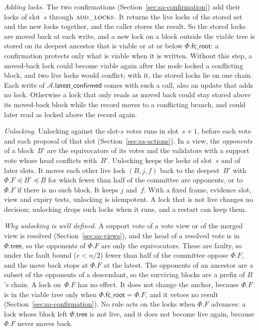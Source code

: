 \documentclass{article}
\newcommand{\AC}{\mathcal A}
\newcommand{\Fr}{\Phi}
\newcommand{\tree}{\mathsf{tree}}
\newcommand{\fcroot}{\mathsf{fc\_root}}
\newcommand{\latestConfirmed}{\mathsf{latest\_confirmed}}
\begin{document}
\emph{Adding locks.}  The two confirmations (Section~\ref{sec:sa-confirmation})
add their locks of slot~$s$ through $\Call{add\_locks}{}$.  It returns the
live locks of the stored set and the new locks together, and the caller
stores the result.  So the stored locks are moved back at each write, and
a new lock on a block outside the viable tree is stored on its deepest
ancestor that is viable or at or below $\Fr.\fcroot$: a confirmation
protects only what is viable when it is written.
Without this step, a moved-back lock could become viable again after the
node locked a conflicting block, and two live locks would conflict; with
it, the stored locks lie on one chain.  Each write of $\AC.\latestConfirmed$ comes with such a call,
also an update that adds no lock.  Otherwise a lock that only reads as
moved back could stay stored above its moved-back block while the record
moves to a conflicting branch, and could later read as locked above the
record again.

\emph{Unlocking.}  Unlocking against the slot-$s$ votes runs in
slot~$s+1$, before each vote and each proposal of that slot
(Section~\ref{sec:sa-actions}).  In a view, the \emph{opponents} of a
block~$B'$ are the equivocators of its votes and the validators with a
support vote whose head conflicts with~$B'$.  Unlocking keeps the locks of
slot~$s$ and of later slots.  It moves each other live lock $(B,j,f)$ back
to the deepest~$B'$ with $\Fr.F\preceq B'\preceq B$ for which fewer than
half of the committee are opponents, or to $\Fr.F$ if there is no such
block.  It keeps $j$ and~$f$.  With a fixed frame, evidence slot, view and expiry
tests, unlocking is idempotent.  A lock that is not live changes no
decision; unlocking drops such locks when it runs, and a restart can keep
them.

\emph{Why unlocking is well defined.}  A support vote of a vote view or of
the merged view is resolved (Section~\ref{sec:sa-views}), and the head of
a resolved vote is in $\Fr.\tree$, so the opponents of $\Fr.F$ are only
the equivocators.  These are faulty, so under the fault bound ($e<n/2$)
fewer than half of the committee oppose $\Fr.F$, and the move back stops
at $\Fr.F$ at the latest.  The opponents of an ancestor are a subset of
the opponents of a descendant, so the surviving blocks are a prefix of
$B$'s chain.  A lock on~$\Fr.F$ has no effect.  It does not change the
anchor, because $\Fr.F$ is in the viable tree only when
$\Fr.\fcroot=\Fr.F$, and it vetoes no result
(Section~\ref{sec:sa-confirmation}).  No rule acts on the locks when
$\Fr.F$ advances: a lock whose block left $\Fr.\tree$ is not live, and it
does not become live again, because $\Fr.F$ never moves back.
\end{document}
